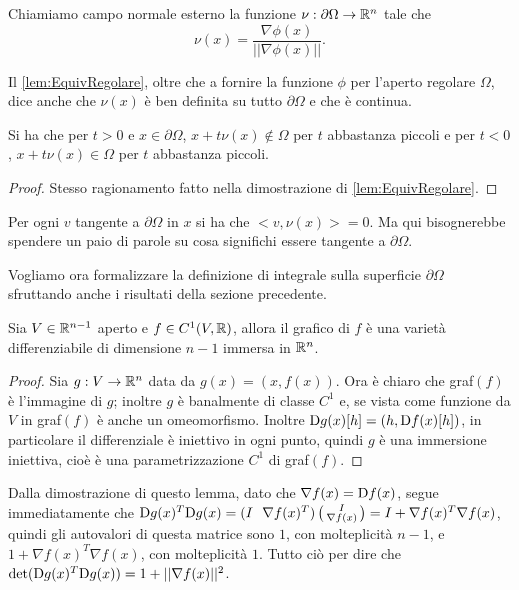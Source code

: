 \begin{definition}
	Chiamiamo campo normale esterno la funzione $\nu:\partial\Omega\rightarrow \mathbb R^n$ tale che
	\[
		\nu(x)=\frac{\nabla \phi(x)}{||\nabla \phi(x)||}.
	\]
\end{definition}

\begin{remark}
	Il \cref{lem:EquivRegolare}, oltre che a fornire la funzione $\phi$ per l'aperto regolare $\Omega$, dice anche che $\nu(x)$ è ben definita
	su tutto $\partial \Omega$ e che è continua.
\end{remark}

\begin{remark}
	Si ha che per $t>0$ e $x\in\partial\Omega$, $x+t\nu(x)\notin \Omega$ per $t$ abbastanza piccoli e per $t<0$, $x+t\nu(x)\in \Omega$ per $t$
	abbastanza piccoli.
\end{remark}
\begin{proof}
	Stesso ragionamento fatto nella dimostrazione di \cref{lem:EquivRegolare}.
\end{proof}

\begin{remark}
	Per ogni $v$ tangente a $\partial\Omega$ in $x$ si ha che $<v,\nu(x)>=0$. Ma qui bisognerebbe spendere un paio di parole su cosa significhi
	essere tangente a $\partial\Omega$.
\end{remark}


Vogliamo ora formalizzare la definizione di integrale sulla superficie $\partial\Omega$ sfruttando anche i risultati della sezione precedente.

\begin{lemma}
	Sia $V\in\mathbb R^{n-1}$ aperto e $f\in C^1(V,\mathbb R)$, allora il grafico di $f$ è una varietà differenziabile di dimensione $n-1$ immersa in $\mathbb R^n$.
\end{lemma}
\begin{proof}
	Sia $g:V\rightarrow \mathbb R^n$ data da $g(x)=(x,f(x))$. Ora è chiaro che graf$(f)$ è l'immagine di $g$; inoltre $g$ è banalmente di classe $C^1$
	e, se vista come funzione da $V$ in graf$(f)$ è anche un omeomorfismo. Inoltre $\mathrm D g(x)[h]=(h,\mathrm D f(x)[h])$, in particolare il differenziale è
	iniettivo in ogni punto, quindi $g$ è una immersione iniettiva, cioè è una parametrizzazione $C^1$ di graf$(f)$.
\end{proof}

\begin{remark}
	Dalla dimostrazione di questo lemma, dato che $\nabla f(x)=\mathrm D f(x)$, segue immediatamente che $\mathrm D g(x)^T \mathrm D g(x)=
	(I \ \ \nabla f(x)^T)
	\left(\begin{smallmatrix}
	I \\
	\nabla f(x)
	\end{smallmatrix}\right)=
	I+\nabla f(x)^T\nabla f(x)$, quindi gli autovalori di questa matrice sono $1$, con molteplicità $n-1$, e $1+\nabla f(x)^T\nabla f(x)$, con 
	molteplicità $1$. Tutto ciò per dire che $\det (\mathrm D g(x)^T \mathrm D g(x)) = 1+||\nabla f(x)||^2$. 
\end{remark}
